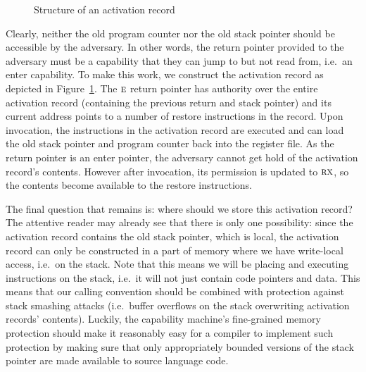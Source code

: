 \documentclass[format=acmsmall, review=true, screen=true]{acmart}
\renewcommand{\figurename}{Figure}
\newcommand{\plainperm}[1]{\textsc{#1}}
\newcommand{\exec}{\plainperm{rx}}
\newcommand{\entry}{\plainperm{e}}
\begin{document}
\begin{figure}[b]
  
  \caption{Structure of an activation record}
  \label{fig:activ-rec-struct}
\end{figure}

Clearly, neither the old program counter nor the old stack pointer should be accessible by the adversary. In
other words, the return pointer provided to the adversary must be a capability
that they can jump to but not read from, i.e.\ an enter capability. To make this
work, we construct the activation record as depicted in
\figurename~\ref{fig:activ-rec-struct}. The $\entry$ return pointer has authority
over the entire activation record (containing the previous return and stack
pointer) and its current address points to a number of restore instructions in
the record. Upon invocation, the instructions in the activation record are executed and can
load the old stack pointer and program counter back into the register file. As
the return pointer is an enter pointer, the adversary cannot get hold of the
activation record's contents. However after invocation, its permission is updated to
$\exec$, so the contents become available to the restore instructions.

The final question that remains is: where should we store this activation
record? The attentive reader may already see that there is only one possibility:
since the activation record contains the old stack pointer, which is local, the
activation record can only be constructed in a part of memory where we have
write-local access, i.e.\ on the stack. Note that this means we will be placing
and executing instructions on the stack, i.e.\ it will not just contain code
pointers and data. This means that our calling convention should be combined
with protection against stack smashing attacks (i.e.\ buffer overflows on the
stack overwriting activation records' contents). Luckily, the capability
machine's fine-grained memory protection \citep{Woodruff:2014:CCM:2665671.2665740} should make it reasonably easy for a
compiler to implement such protection by making sure that only appropriately
bounded versions of the stack pointer are made available to source language
code.
\end{document}
